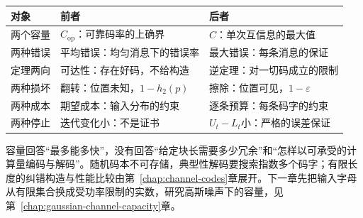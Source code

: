 \begin{BookInlineTable}
 \centering
 \caption{本章几组相邻概念的区别。}
 \label{tab:dcc-summary-contrast}
 \begin{tabular}{p{18mm}p{39mm}p{39mm}}
  \toprule
  对象 & 前者 & 后者 \\
  \midrule
  两个容量 & $C_{\mathrm{op}}$：可靠码率的上确界 & $C$：单次互信息的最大值 \\
  两种错误 & 平均错误：均匀消息下的错误率 & 最大错误：每条消息的保证 \\
  定理两向 & 可达性：存在好码，不给构造 & 逆定理：对一切码成立的限制 \\
  两种损坏 & 翻转：位置未知，$1-h_2(p)$ & 擦除：位置可见，$1-\varepsilon$ \\
  两种成本 & 期望成本：输入分布的约束 & 逐条预算：每条码字的约束 \\
  两种停止 & 迭代变化小：不是证书 & $U_t-L_t$小：严格的误差保证 \\
  \bottomrule
 \end{tabular}
\end{BookInlineTable}

容量回答“最多能多快”，没有回答“给定块长需要多少冗余”和“怎样以可承受的计算量编码与解码”。随机码本不可存储，典型性解码要搜索指数多个码字；有限长度的纠错构造与性能比较由第~\ref{chap:channel-codes}章展开。下一章先把输入字母从有限集合换成受功率限制的实数，研究高斯噪声下的容量，见第~\ref{chap:gaussian-channel-capacity}章。
